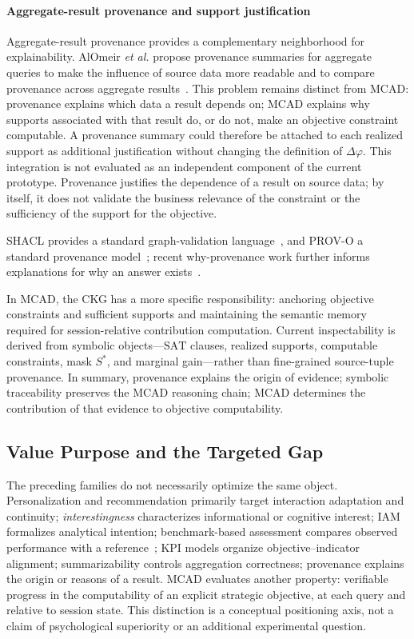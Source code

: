 \documentclass[journal]{IEEEtran}
\begin{document}
\paragraph*{Aggregate-result provenance and support justification}
Aggregate-result provenance provides a complementary neighborhood for explainability. AlOmeir \emph{et al.} propose provenance summaries for aggregate queries to make the influence of source data more readable and to compare provenance across aggregate results~\cite{AlOmeirLaiMilaniPottinger2023}. This problem remains distinct from MCAD: provenance explains which data a result depends on; MCAD explains why supports associated with that result do, or do not, make an objective constraint computable. A provenance summary could therefore be attached to each realized support as additional justification without changing the definition of $\Delta\varphi$. This integration is not evaluated as an independent component of the current prototype. Provenance justifies the dependence of a result on source data; by itself, it does not validate the business relevance of the constraint or the sufficiency of the support for the objective.

SHACL provides a standard graph-validation language~\cite{W3CSHACL2017}, and PROV-O a standard provenance model~\cite{W3CPROVO2013}; recent why-provenance work further informs explanations for why an answer exists~\cite{CalauttiEtAl2024}.

In MCAD, the CKG has a more specific responsibility: anchoring objective constraints and sufficient supports and maintaining the semantic memory required for session-relative contribution computation. Current inspectability is derived from symbolic objects---$\mathrm{SAT}$ clauses, realized supports, computable constraints, mask $S^*$, and marginal gain---rather than fine-grained source-tuple provenance. In summary, provenance explains the origin of evidence; symbolic traceability preserves the MCAD reasoning chain; MCAD determines the contribution of that evidence to objective computability.

\subsection{Value Purpose and the Targeted Gap}

The preceding families do not necessarily optimize the same object. Personalization and recommendation primarily target interaction adaptation and continuity; \emph{interestingness} characterizes informational or cognitive interest; IAM formalizes analytical intention; benchmark-based assessment compares observed performance with a reference~\cite{FranciaAssess2021}; KPI models organize objective--indicator alignment; summarizability controls aggregation correctness; provenance explains the origin or reasons of a result. MCAD evaluates another property: verifiable progress in the computability of an explicit strategic objective, at each query and relative to session state. This distinction is a conceptual positioning axis, not a claim of psychological superiority or an additional experimental question.
\end{document}
